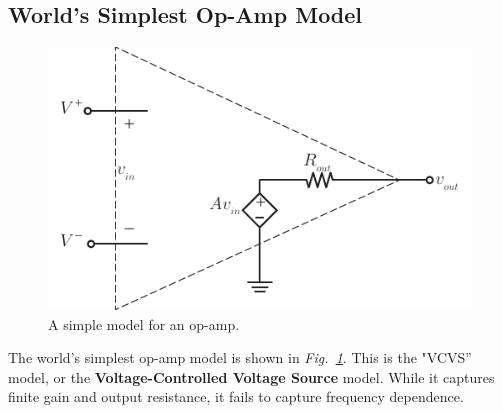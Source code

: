 \subsection{World's Simplest Op-Amp Model}
\begin{figure}[tb]
\centering
\includegraphics[scale=1]{opamp_model}
\caption{A simple model for an op-amp.}
\label{fig:opamp_model}
\end{figure}
The world's simplest op-amp model is shown in \emph{Fig.~\ref{fig:opamp_model}}. This is the "VCVS'' model, or the \textbf{Voltage-Controlled Voltage Source} model.  While it captures finite gain and output resistance, it fails to capture frequency dependence.
